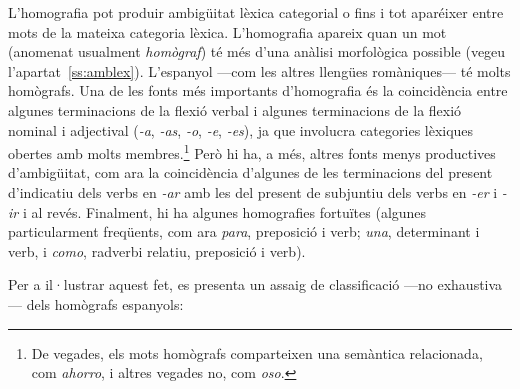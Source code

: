 L'homografia pot produir ambigüitat lèxica categorial o fins i tot
aparéixer entre mots de la mateixa categoria lèxica. L'homografia
apareix quan un mot (anomenat usualment \emph{homògraf}) té més d'una
anàlisi morfològica possible (vegeu
l'apartat~\ref{ss:amblex}). L'espanyol ---com les altres llengües
romà\-ni\-ques--- té molts homògrafs. Una de les fonts més importants
d'homografia és la coincidència entre algunes terminacions de la
flexió verbal i algunes terminacions de la flexió nominal i adjectival
(\emph{-a}, \emph{-as}, \emph{-o}, \emph{-e}, \emph{-es}), ja que
involucra categories lèxiques obertes amb molts membres.\footnote{De
  vegades, els mots homògrafs comparteixen una semàntica relacionada,
  com \emph{ahorro}, i altres vegades no, com \emph{oso}.} Però hi ha,
a més, altres fonts menys productives d'ambigüitat, com ara la
coincidència d'algunes de les terminacions del present d'indicatiu
dels verbs en \emph{-ar} amb les del present de subjuntiu dels verbs
en \emph{-er} i \emph{-ir} i al revés. Finalment, hi ha algunes
homografies fortuïtes (algunes particularment freqüents, com ara
\emph{para}, preposició i verb; \emph{una}, determinant i verb, i \emph{como}, radverbi relatiu, preposició i verb).

Per a il·lustrar aquest fet, es presenta un assaig de classificació 
---no exhaustiva---  dels homògrafs espanyols:

